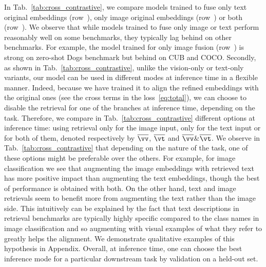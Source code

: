 In Tab.~\ref{tab:cross_contrastive}, we compare models trained to fuse only text original embeddings (row~), only image original embeddings (row~) or both (row~).
We observe that while models trained to fuse only image or text perform reasonably well on some benchmarks, they typically lag behind on other benchmarks.
For example, the model trained for only image fusion (row~) is strong on zero-shot Dogs benchmark but behind on CUB and COCO.
Secondly, as shown in Tab.~\ref{tab:cross_contrastive}, unlike the vision-only or text-only variants, our model can be used in different modes at inference time in a flexible manner.
Indeed, because we have trained it to align the refined embeddings with the original ones (see the cross terms in the loss~\ref{eq:total}), we can choose to disable the retrieval for one of the branches at inference time, depending on the task.
Therefore, we compare in Tab.~\ref{tab:cross_contrastive} different options at inference time: using retrieval only for the image input, only for the text input or for both of them, denoted respectively by $\overline{\vv}$, $\overline{\vt}$ and $\overline{\vv}$\&$\overline{\vt}$.
We observe in Tab.~\ref{tab:cross_contrastive} that depending on the nature of the task, one of these options might be preferable over the others.
For example, for image classification we see that augmenting the image embeddings with retrieved text has more positive impact than augmenting the text embeddings, though the best of performance is obtained with both.
On the other hand, text and image retrievals seem to benefit more from augmenting the text rather than the image side.
This intuitively can be explained by the fact that text descriptions in retrieval benchmarks are typically highly specific compared to the class names in image classification and so augmenting with visual examples of what they refer to greatly helps the alignment.
We demonstrate qualitative examples of this hypothesis in Appendix.
Overall, at inference time, one can choose the best inference mode for a particular downstream task by validation on a held-out set.


